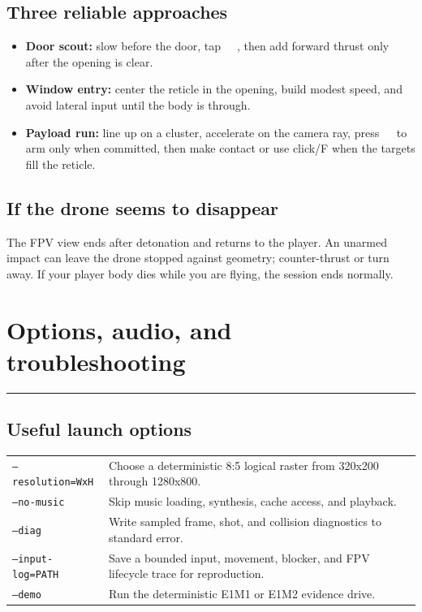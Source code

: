 \documentclass[10pt]{article}
\newcommand{\key}[1]{%
  \begingroup
  \setlength{\fboxsep}{2.5pt}%
  \colorbox{Ink}{\textcolor{white}{\sffamily\bfseries\footnotesize #1}}%
  \endgroup
}
\newcommand{\sectionrule}[1]{%
  \vspace{2pt}
  {\color{#1}\rule{\linewidth}{1.5pt}}
}
\begin{document}
\subsection*{Three reliable approaches}

\begin{itemize}
  \item \textbf{Door scout:} slow before the door, tap \key{E}, then add forward
  thrust only after the opening is clear.
  \item \textbf{Window entry:} center the reticle in the opening, build modest
  speed, and avoid lateral input until the body is through.
  \item \textbf{Payload run:} line up on a cluster, accelerate on the camera ray,
  press \key{X} to arm only when committed, then make contact or use click/F
  when the targets fill the reticle.
\end{itemize}

\subsection*{If the drone seems to disappear}

The FPV view ends after detonation and returns to the player. An unarmed impact
can leave the drone stopped against geometry; counter-thrust or turn away. If
your player body dies while you are flying, the session ends normally.

\newpage
\section*{Options, audio, and troubleshooting}
\sectionrule{ShieldCyan}

\subsection*{Useful launch options}

\begin{tabularx}{\linewidth}{K Y}
\texttt{--resolution=WxH} & Choose a deterministic 8:5 logical raster from 320x200 through 1280x800. \\
\texttt{--no-music} & Skip music loading, synthesis, cache access, and playback. \\
\texttt{--diag} & Write sampled frame, shot, and collision diagnostics to standard error. \\
\texttt{--input-log=PATH} & Save a bounded input, movement, blocker, and FPV lifecycle trace for reproduction. \\
\texttt{--demo} & Run the deterministic E1M1 or E1M2 evidence drive. \\
\end{tabularx}
\end{document}
